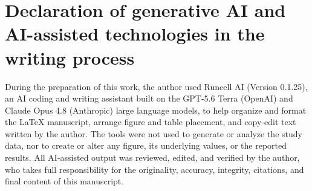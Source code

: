 \documentclass[final,5p,times,twocolumn]{elsarticle}
\begin{document}
\section*{Declaration of generative AI and AI-assisted technologies in the writing process}
During the preparation of this work, the author used Runcell AI (Version 0.1.25), an AI coding and writing assistant built on the GPT-5.6 Terra (OpenAI) and Claude Opus 4.8 (Anthropic) large language models, to help organize and format the \LaTeX{} manuscript, arrange figure and table placement, and copy-edit text written by the author.
The tools were not used to generate or analyze the study data, nor to create or alter any figure, its underlying values, or the reported results.
All AI-assisted output was reviewed, edited, and verified by the author, who takes full responsibility for the originality, accuracy, integrity, citations, and final content of this manuscript.




\end{document}
